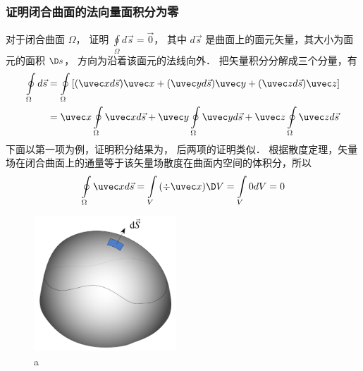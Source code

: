 
\subsubsection{证明闭合曲面的法向量面积分为零}
对于闭合曲面 $\Omega $，  证明 $\oint\limits_\Omega  {d\vec s = \vec 0} $， 其中 $d\vec s$ 是曲面上的面元矢量，其大小为面元的面积 $\D s$，  方向为沿着该面元的法线向外．
把矢量积分分解成三个分量，有
 \begin{equation}
\begin{aligned}
\oint\limits_\Omega  {d\vec s} & = \oint\limits_\Omega  {[(\uvec xd\vec s)\uvec x + (\uvec yd\vec s)\uvec y + (\uvec zd\vec s)\uvec z]} \\
 &= \uvec x\oint\limits_\Omega  {\uvec xd\vec s}  + \uvec y\oint\limits_\Omega  {\uvec y} d\vec s + \uvec z\oint\limits_\Omega  {\uvec zd\vec s} 
\end{aligned}
\end{equation}
下面以第一项为例，证明积分结果为， 后两项的证明类似．
根据散度定理，矢量场在闭合曲面上的通量等于该矢量场散度在曲面内空间的体积分，所以
  \begin{equation}
\oint\limits_\Omega  {\uvec xd\vec s}  = \int\limits_V {(\div \uvec x)\D V}  = \int\limits_V {0dV}  = 0
\end{equation}
\begin{figure}[h]
\centering
\includegraphics[width=5.34cm]{./figures/CSI0.pdf}
\caption{a} \label{CSI0_fig1}
\end{figure}

 
 

